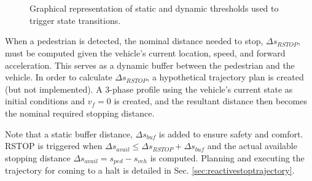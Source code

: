 \documentclass[letterpaper, 10 pt, conference]{ieeeconf}  %
\begin{document}
\begin{figure}[tb]
\centering%
  \\
  \\
  \caption{Graphical representation of static and dynamic thresholds used to trigger state transitions.}
  \label{fig:react}
\end{figure}

When a pedestrian is detected, the nominal distance needed to stop, $\Delta s_{RSTOP}$, must be computed given the vehicle's current location, speed, and forward acceleration.
This serves as a dynamic buffer between the pedestrian and the vehicle.
In order to calculate $\Delta s_{RSTOP}$, a hypothetical trajectory plan is created (but not implemented).
A 3-phase profile using the vehicle's current state as initial conditions and $v_f = 0$ is created, and the resultant distance then becomes the nominal required stopping distance.

Note that a static buffer distance, $\Delta s_{buf}$ is added to ensure safety and comfort.
RSTOP is triggered when $\Delta s_{avail} \leqslant \Delta s_{RSTOP} + \Delta s_{buf}$ and the actual available stopping distance $\Delta s_{avail} = s_{ped} - s_{veh}$ is computed.
Planning and executing the trajectory for coming to a halt is detailed in Sec. \ref{sec:reactivestoptrajectory}.
\end{document}
